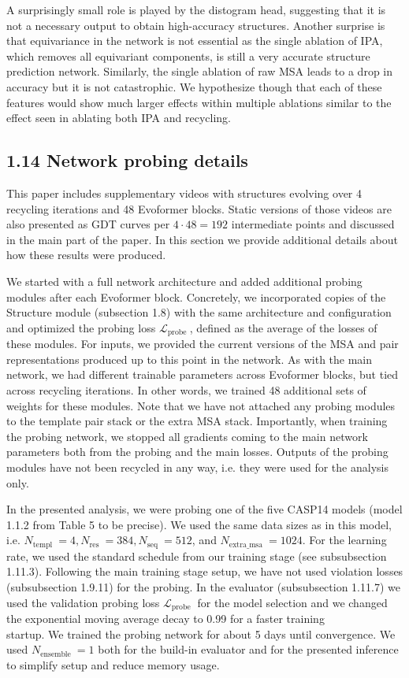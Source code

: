 \documentclass[10pt]{article}
\begin{document}
A surprisingly small role is played by the distogram head, suggesting that it is not a necessary output to obtain high-accuracy structures. Another surprise is that equivariance in the network is not essential as the single ablation of IPA, which removes all equivariant components, is still a very accurate structure prediction network. Similarly, the single ablation of raw MSA leads to a drop in accuracy but it is not catastrophic. We hypothesize though that each of these features would show much larger effects within multiple ablations similar to the effect seen in ablating both IPA and recycling.

\subsection*{1.14 Network probing details}
This paper includes supplementary videos with structures evolving over 4 recycling iterations and 48 Evoformer blocks. Static versions of those videos are also presented as GDT curves per $4 \cdot 48=192$ intermediate points and discussed in the main part of the paper. In this section we provide additional details about how these results were produced.

We started with a full network architecture and added additional probing modules after each Evoformer block. Concretely, we incorporated copies of the Structure module (subsection 1.8) with the same architecture and configuration and optimized the probing loss $\mathcal{L}_{\text {probe }}$, defined as the average of the losses of these modules. For inputs, we provided the current versions of the MSA and pair representations produced up to this point in the network. As with the main network, we had different trainable parameters across Evoformer blocks, but tied across recycling iterations. In other words, we trained 48 additional sets of weights for these modules. Note that we have not attached any probing modules to the template pair stack or the extra MSA stack. Importantly, when training the probing network, we stopped all gradients coming to the main network parameters both from the probing and the main losses. Outputs of the probing modules have not been recycled in any way, i.e. they were used for the analysis only.

In the presented analysis, we were probing one of the five CASP14 models (model 1.1.2 from Table 5 to be precise). We used the same data sizes as in this model, i.e. $N_{\text {templ }}=4, N_{\text {res }}=384, N_{\text {seq }}=512$, and $N_{\text {extra_msa }}=1024$. For the learning rate, we used the standard schedule from our training stage (see subsubsection 1.11.3). Following the main training stage setup, we have not used violation losses (subsubsection 1.9.11) for the probing. In the evaluator (subsubsection 1.11.7) we used the validation probing loss $\mathcal{L}_{\text {probe }}$ for the model selection and we changed the exponential moving average decay to 0.99 for a faster training\\
startup. We trained the probing network for about 5 days until convergence. We used $N_{\text {ensemble }}=1$ both for the build-in evaluator and for the presented inference to simplify setup and reduce memory usage.
\end{document}
